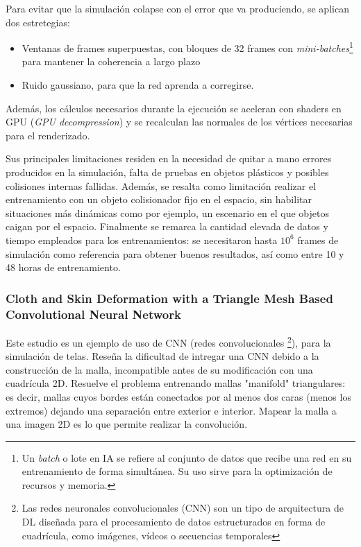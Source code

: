 Para evitar que la simulación colapse con el error que va produciendo, se aplican dos estretegias: 
\begin{itemize}
  \item Ventanas de frames superpuestas, con bloques de 32 frames con \textit{mini-batches}\footnote{Un \textit{batch} o lote en IA se refiere al conjunto de datos que recibe una red en su entrenamiento de forma simultánea. Su uso sirve para la optimización de recursos y memoria. } para mantener la coherencia a largo plazo
  \item Ruido gaussiano, para que la red aprenda a corregirse.
\end{itemize}
Además, los cálculos necesarios durante la ejecución se aceleran con shaders en GPU (\textit{GPU decompression}) y se recalculan las normales de los vértices necesarias para el renderizado. \newline

Sus principales limitaciones residen en la necesidad de quitar a mano errores producidos en la simulación, falta de pruebas en objetos plásticos y posibles colisiones internas fallidas. Además, se resalta como limitación realizar el entrenamiento con un objeto colisionador fijo en el espacio, sin habilitar situaciones más dinámicas como por ejemplo, un escenario en el que objetos caigan por el espacio. Finalmente se remarca la cantidad elevada de datos y tiempo empleados para los entrenamientos: se necesitaron hasta $10^{6}$ frames de simulación como referencia para obtener buenos resultados, así como entre 10 y 48 horas de entrenamiento.\newline

\subsubsection{Cloth and Skin Deformation with a Triangle Mesh Based Convolutional Neural Network}

Este estudio \cite{chentanez_cloth_2020} es un ejemplo de uso de CNN (redes convolucionales \footnote{Las redes neuronales convolucionales (CNN) son un tipo de arquitectura de DL diseñada para el procesamiento de datos estructurados en forma de cuadrícula, como imágenes, vídeos o secuencias temporales}), para la simulación de telas. Reseña la dificultad de intregar una CNN debido a la construcción de la malla, incompatible antes de su modificación con una cuadrícula 2D. Resuelve el problema entrenando mallas "manifold" triangulares: es decir, mallas cuyos bordes están conectados por al menos dos caras (menos los extremos) dejando una separación entre exterior e interior. Mapear la malla a una imagen 2D es lo que permite realizar la convolución. \newline

